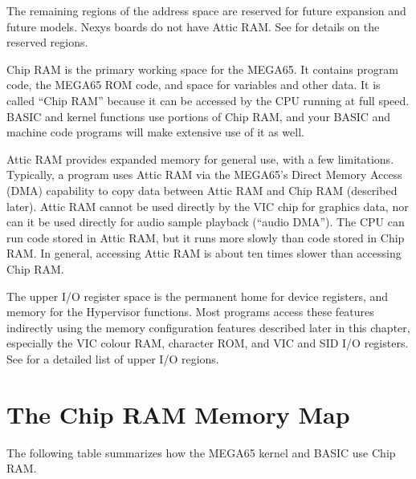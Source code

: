 The remaining regions of the address space are reserved for future expansion
and future models. Nexys boards do not have Attic RAM. See
 for details on the reserved regions.

Chip RAM is the primary working space for the MEGA65. It contains program code,
the MEGA65 ROM code, and space for variables and other data. It is called ``Chip
RAM'' because it can be accessed by the CPU running at full speed. BASIC and
kernel functions use portions of Chip RAM, and your BASIC and machine code
programs will make extensive use of it as well.

Attic RAM provides expanded memory for general use, with a few limitations.
Typically, a program uses Attic RAM via the MEGA65's Direct Memory Access (DMA) capability to
copy data between Attic RAM and Chip RAM (described later). Attic RAM cannot be used directly by the VIC
chip for graphics data, nor can it be used directly for audio sample playback
(``audio DMA''). The CPU can run code stored in Attic RAM, but it runs more
slowly than code stored in Chip RAM. In general, accessing Attic RAM is about
ten times slower than accessing Chip RAM.

The upper I/O register space is the permanent home for device registers, and
memory for the Hypervisor functions. Most programs access these features
indirectly using the memory configuration features described later in this
chapter, especially the VIC colour RAM, character ROM, and VIC and SID I/O
registers. See  for a detailed list of upper I/O regions.


\newpage
\section{The Chip RAM Memory Map}

The following table summarizes how the MEGA65 kernel and BASIC use Chip RAM.

